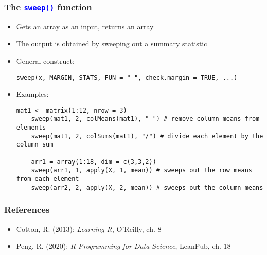 \documentclass[10pt]{beamer}
\newcommand{\cc}[1]{\texttt{\textcolor{blue}{#1}}}
\theoremstyle{definition}
\begin{document}
\begin{frame}[fragile]
\frametitle{The \cc{sweep()} function}
\begin{itemize}
	\item Gets an array as an input, returns an array
	\item The output is obtained by sweeping out a summary statistic
	\item General construct:
	\begin{lstlisting}[style = rstyle, breaklines]
	sweep(x, MARGIN, STATS, FUN = "-", check.margin = TRUE, ...)
	\end{lstlisting}
	\item Examples:
	\begin{lstlisting}[style = rstyle, breaklines]
	mat1 <- matrix(1:12, nrow = 3)
	sweep(mat1, 2, colMeans(mat1), "-") # remove column means from elements
	sweep(mat1, 2, colSums(mat1), "/") # divide each element by the column sum

	arr1 = array(1:18, dim = c(3,3,2))
	sweep(arr1, 1, apply(X, 1, mean)) # sweeps out the row means from each element
	sweep(arr2, 2, apply(X, 2, mean)) # sweeps out the column means
	\end{lstlisting}
\end{itemize}
\end{frame}

\begin{frame}[fragile]
\frametitle{References}
\begin{itemize}
	\item Cotton, R. (2013): \emph{Learning R}, O'Reilly, ch. 8
	\item Peng, R. (2020): \emph{R Programming for Data Science}, LeanPub, ch. 18
\end{itemize}
\end{frame}
\end{document}

